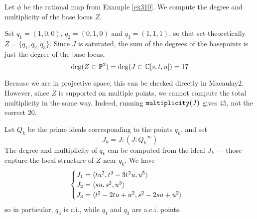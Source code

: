 \documentclass[fleqn,reqno]{amsart}
\numberwithin{first}{chapter}
\begin{document}
\begin{example}[$\mt{ex311}$]
\label{ex311}
Let $\phi$ be the rational map from Example \ref{ex310}.
We compute the degree and multiplicity of the base locus $Z$.

Set $q_1=(1,0,0)$, $q_2=(0,1,0)$ and $q_3=(1,1,1)$, so that set-theoretically $Z=\{q_1,q_2,q_3\}$.
Since $J$ is saturated,
the sum of the degrees of the basepoints is just the degree of the base locus,
\[
	\deg(Z\subset\mathbb{P}^2)=\deg(J\subset\mathbb{C}[s,t,u])=17
\]

Because we are in projective space, this can be checked directly in Macaulay2.
However, since $Z$ is supported on multiple points,
we cannot compute the total multiplicity in the same way.
Indeed, running $\mathop{\tt multiplicity}(J)$ gives $45$, not the correct $20$.

Let $Q_k$ be the prime ideals corresponding to the points $q_k$, and set
\[
	J_k=J:(J:{Q_k}^\infty)
\]
The degree and multiplicity of $q_k$ can be computed from the ideal $J_k$ ---
those capture the local structure of $Z$ near $q_k$.
We have
\[
	\begin{cases}
	J_1=\langle t u^{2},t^{3}-3 t^{2} u,u^{5}\rangle\\
	J_2=\langle s u,s^{2},u^{3}\rangle\\
	J_3=\langle t^{2}-2 t u+u^{2},s^{2}-2 s u+u^{2}\rangle
	\end{cases}
\]
so in particular, $q_3$ is c.i., while $q_1$ and $q_2$ are a.c.i. points.
\end{example}
\end{document}
